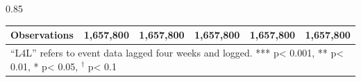 \documentclass[12pt,letterpaper]{article}
\begin{document}
\begin{landscape}
\begin{center}
\begin{spacing}{0.85}
\begin{longtable}{lccccc}
Observations & 1,657,800 & 1,657,800 & 1,657,800 & 1,657,800 & 1,657,800 \\ \hline


\hline  
\multicolumn{6}{l}{``L4L'' refers to event data lagged four weeks and logged.  *** p< 0.001, ** p< 0.01, * p< 0.05, $^{\dag}$ p< 0.1} \\
 

\end{longtable}
\end{spacing}
\end{center}
\end{landscape}



\end{document}
